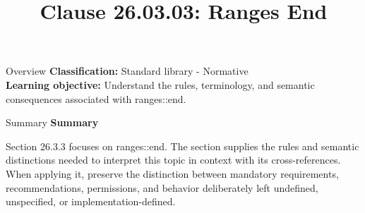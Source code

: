 \documentclass[10pt,letterpaper]{article}
\title{Clause 26.03.03: Ranges End}
\author{}
\date{}
\begin{document}
\maketitle
\begin{CornellOverviewBox}{Overview}
\textbf{Classification:} Standard library - Normative\\[2pt]
\textbf{Learning objective:} Understand the rules, terminology, and semantic consequences associated with ranges::end.
\end{CornellOverviewBox}\begin{CornellSummaryBox}{Summary}
{\sffamily\bfseries\color{Accent} Summary}\par\vspace{3pt}Section 26.3.3 focuses on ranges::end. The section supplies the rules and semantic distinctions needed to interpret this topic in context with its cross-references. When applying it, preserve the distinction between mandatory requirements, recommendations, permissions, and behavior deliberately left undefined, unspecified, or implementation-defined.
\end{CornellSummaryBox}
\end{document}
